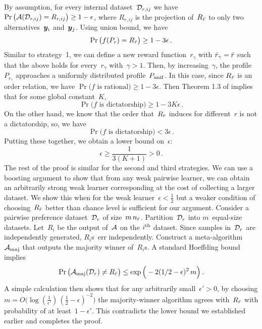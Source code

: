 \begin{proofEnd}
    By assumption, for every internal dataset~${\mathcal{D}}_{r, ij}$ we have $\Pr\big({\mathcal{A}}({\mathcal{D}}_{r, ij}) = R_{r, ij}\big) \ge 1 - \epsilon$, where $R_{r, ij}$ is the projection of~$R_{\bar{r}}$ to only two alternatives~${\bm{y}}_i$ and~${\bm{y}}_j$. Using union bound, we have
    \begin{equation*}
        \Pr\big(f(P_r) = R_{\bar{r}}\big) \ge 1 - 3 \epsilon
        \,.
    \end{equation*}
    Similar to strategy~1, we can define a new reward function~$r_\gamma$ with ${\bar{r}}_\gamma = {\bar{r}}$ such that the above holds for every~$r_\gamma$ with~$\gamma > 1$. Then, by increasing~$\gamma$, the profile~$P_{r_\gamma}$ approaches a uniformly distributed profile~$P_{\rm unif}$. In this case, since $R_{\bar{r}}$ is an order relation, we have $\Pr\big(f \text{ is rational}\big) \ge 1 - 3\epsilon$. Then Theorem 1.3 of \citet{friedgut2002boolean} implies that for some global constant~$K$, 
    \begin{equation*}
        \Pr\big(f \text{ is dictatorship}\big) \ge 1 - 3 K \epsilon
        \,.
    \end{equation*}
    On the other hand, we know that the order that~$R_{\bar{r}}$ induces for different~$r$ is not a dictatorship, so, we have
    \begin{equation*}
        \Pr\big(f \text{ is dictatorship}\big) < 3 \epsilon
        \,.
    \end{equation*}
    Putting these together, we obtain a lower bound on~$\epsilon$:
    \begin{equation*}
        \epsilon \ge \frac{1}{3 (K + 1)} > 0
        \,.
    \end{equation*}
    The rest of the proof is similar for the second and third strategies. We can use a boosting argument to show that from any weak pairwise learner, we can obtain an arbitrarily strong weak learner corresponding at the cost of collecting a larger dataset. We show this when for the weak learner~$\epsilon < \frac{1}{2}$ but a weaker condition of choosing~$R_{\bar{r}}$ better than chance level is sufficient for our argument. Consider a pairwise preference dataset~${\mathcal{D}}_r$ of size~$m \, n_{\bar{r}}$. Partition~${\mathcal{D}}_r$ into $m$~equal-size datasets. Let~$R_i$ be the output of~${\mathcal{A}}$ on the $i^{\rm th}$ dataset. Since samples in~${\mathcal{D}}_r$ are independently generated, $R_i$s~err independently. Construct a meta-algorithm~${\mathcal{A}}_{\rm maj}$ that outputs the majority winner of~$R_i$s. A standard Hoeffding bound implies
    \begin{equation*}
        \Pr\big({\mathcal{A}}_{\rm maj}({\mathcal{D}}_r) \neq R_{\bar{r}}\big) \le \exp\Big(-2(1/2 - \epsilon)^2 \, m\Big)
        \,.
    \end{equation*}
    A simple calculation then shows that for any arbitrarily small~$\epsilon' > 0$, by choosing $m = O\big(\log(\frac{1}{\epsilon'}) \, (\frac{1}{2} - \epsilon)^{-2}\big)$ the majority-winner algorithm agrees with~$R_{\bar{r}}$ with probability of at least~$1-\epsilon'$. This contradicts the lower bound we established earlier and completes the proof.


\end{proofEnd}
